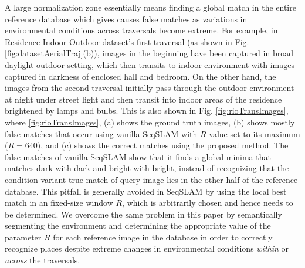 \documentclass[letterpaper, 10 pt, conference]{ieeeconf}  %
\begin{document}
A large normalization zone essentially means finding a global match in the entire reference database which gives causes false matches as variations in environmental conditions across traversals become extreme. For example, in Residence Indoor-Outdoor dataset's first traversal (as shown in Fig. \ref{fig:datasetAerialTraj}(b)), images in the beginning have been captured in broad daylight outdoor setting, which then transits to indoor environment with images captured in darkness of enclosed hall and bedroom. On the other hand, the images from the second traversal initially pass through the outdoor environment at night under street light and then transit into indoor areas of the residence brightened by lamps and bulbs. This is also shown in Fig. \ref{fig:rioTransImages}, where \ref{fig:rioTransImages}, (a) shows the ground truth images, (b) shows mostly false matches that occur using vanilla SeqSLAM with $R$ value set to its maximum ($R=640$), and (c) shows the correct matches using the proposed method. The false matches of vanilla SeqSLAM show that it finds a global minima that matches dark with dark and bright with bright, instead of recognizing that the condition-variant true match of query image lies in the other half of the reference database. This pitfall is generally avoided in SeqSLAM by using the local best match in an fixed-size window $R$, which is arbitrarily chosen and hence needs to be determined. We overcome the same problem in this paper by semantically segmenting the environment and determining the appropriate value of the parameter $R$ for each reference image in the database in order to correctly recognize places despite extreme changes in environmental conditions \emph{within} or \emph{across} the traversals.

\newcommand{\imgW}{2.0cm}
\newcommand{\imgH}{0.8cm}
\end{document}
